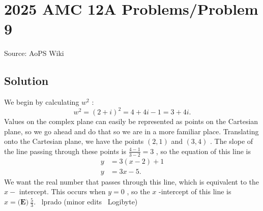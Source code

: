\documentclass[12pt]{article}
\begin{document}
\section*{{2025 AMC 12A Problems/Problem 9}}
Source: AoPS Wiki

\subsection*{Solution}
We begin by calculating $w^2$ : \[w^2 = (2+i)^2 = 4+4i-1 = 3+4i.\] Values on the complex plane can easily be represented as points on the Cartesian plane, so we go ahead and do that so we are in a more familiar place.
Translating onto the Cartesian plane, we have the points $(2,1)$ and $(3,4)$ . The slope of the line passing through these points is $\frac{4-1}{3-2} = 3$ , so the equation of this line is \begin{align*} y &= 3(x-2)+1 \\ y &= 3x-5. \end{align*} We want the real number that passes through this line, which is equivalent to the $x-$ intercept. This occurs when $y=0$ , so the $x$ -intercept of this line is $x=\boxed{\textbf{(E)}~\frac53}.$ ~lprado (minor edits ~Logibyte)
\end{document}
